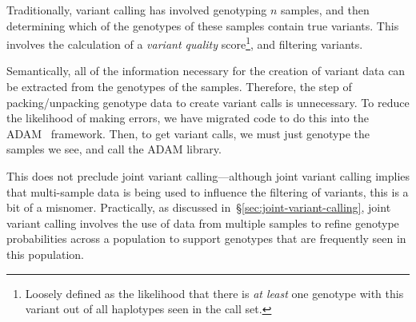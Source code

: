 \documentclass{acm_proc_article-sp}
\begin{document}
Traditionally, variant calling has involved genotyping $n$ samples, and then determining which of the genotypes of these samples
contain true variants. This involves the calculation of a \textit{variant quality} score\footnote{Loosely defined as the likelihood that
there is \emph{at least} one genotype with this variant out of all haplotypes seen in the call set.}, and filtering variants.

Semantically, all of the information necessary for the creation of variant data can be extracted from the genotypes of the samples.
Therefore, the step of packing/unpacking genotype data to create variant calls is unnecessary. To reduce the likelihood of making
errors, we have migrated code to do this into the ADAM~\cite{massie13} framework. Then, to get variant calls, we must just genotype
the samples we see, and call the ADAM library.

This does not preclude joint variant calling---although joint variant calling implies that multi-sample data is being used to influence
the filtering of variants, this is a bit of a misnomer. Practically, as discussed in~\S\ref{sec:joint-variant-calling}, joint variant calling
involves the use of data from multiple samples to refine genotype probabilities across a population to support genotypes that are
frequently seen in this population.

%

  

\balancecolumns
\end{document}
